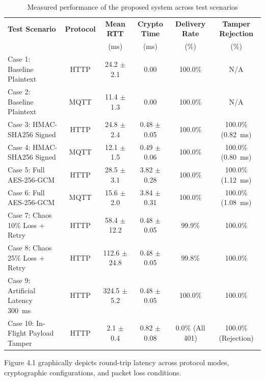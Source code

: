 \documentclass[12pt,a4paper]{report}
\begin{document}
\begin{table}[H]
\centering
\caption{Measured performance of the proposed system across test scenarios}
\label{tab:performance_results}
\footnotesize
\begin{tabularx}{\textwidth}{>{\raggedright\arraybackslash}X c c c c c}
\toprule
\textbf{Test Scenario} & \textbf{Protocol} & \textbf{Mean RTT} & \textbf{Crypto Time} & \textbf{Delivery Rate} & \textbf{Tamper Rejection} \\
& & (ms) & (ms) & (\%) & (\%) \\
\midrule
Case 1: Baseline Plaintext & HTTP & 24.2 $\pm$ 2.1 & 0.00 & 100.0\% & N/A \\
Case 2: Baseline Plaintext & MQTT & 11.4 $\pm$ 1.3 & 0.00 & 100.0\% & N/A \\
Case 3: HMAC-SHA256 Signed & HTTP & 24.8 $\pm$ 2.4 & 0.48 $\pm$ 0.05 & 100.0\% & 100.0\% (0.82~ms) \\
Case 4: HMAC-SHA256 Signed & MQTT & 12.1 $\pm$ 1.5 & 0.49 $\pm$ 0.06 & 100.0\% & 100.0\% (0.80~ms) \\
Case 5: Full AES-256-GCM & HTTP & 28.5 $\pm$ 3.1 & 3.82 $\pm$ 0.28 & 100.0\% & 100.0\% (1.12~ms) \\
Case 6: Full AES-256-GCM & MQTT & 15.6 $\pm$ 2.0 & 3.84 $\pm$ 0.31 & 100.0\% & 100.0\% (1.08~ms) \\
Case 7: Chaos 10\% Loss + Retry & HTTP & 58.4 $\pm$ 12.2 & 0.48 $\pm$ 0.05 & 99.9\% & 100.0\% \\
Case 8: Chaos 25\% Loss + Retry & HTTP & 112.6 $\pm$ 24.8 & 0.48 $\pm$ 0.05 & 99.8\% & 100.0\% \\
Case 9: Artificial Latency 300~ms & HTTP & 324.5 $\pm$ 5.2 & 0.48 $\pm$ 0.05 & 100.0\% & 100.0\% \\
Case 10: In-Flight Payload Tamper & HTTP & 2.1 $\pm$ 0.4 & 0.82 $\pm$ 0.08 & 0.0\% (All 401) & 100.0\% (Rejection) \\
\bottomrule
\end{tabularx}
\end{table}

Figure 4.1 graphically depicts round-trip latency across protocol modes, cryptographic configurations, and packet loss conditions.
\end{document}

